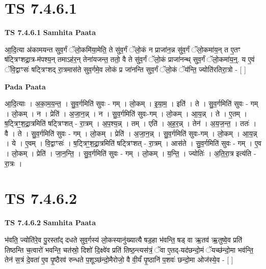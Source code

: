 \documentclass[17pt]{extarticle}
\begin{document}
\section*{ TS 7.4.6.1 }

\textbf{TS 7.4.6.1 } \newline
\textbf{Samhita Paata} \newline

आ॒दि॒त्या अ॑कामयन्त सुव॒र्गं ॅलो॒कमि॑या॒मेति॒ ते सु॑व॒र्गं ॅलो॒कं न प्राजा॑न॒न्न सु॑व॒र्गं ॅलो॒कमा॑य॒न् त ए॒तꣳ ष॑ट्त्रिꣳशद्रा॒त्र-म॑पश्य॒न् तमाऽह॑र॒न् तेना॑यजन्त॒ ततो॒ वै ते सु॑व॒र्गं ॅलो॒कं प्राजा॑नन्थ् सुव॒र्गं ॅलो॒कमा॑य॒न्॒. य ए॒वं ॅवि॒द्वाꣳसः॑ षट्त्रिꣳशद् रा॒त्रमास॑ते सुव॒र्गमे॒व लोकं प्र जा॑नन्ति सुव॒र्गं ॅलो॒कं ॅय॑न्ति॒ ज्योति॑रतिरा॒त्रो - [  ] \newline

\textbf{Pada Paata} \newline

आ॒दि॒त्याः । अ॒का॒म॒य॒न्त॒ । सु॒व॒र्गमिति॑ सुवः - गम् । लो॒कम् । इ॒या॒म॒ । इति॑ । ते । सु॒व॒र्गमिति॑ सुवः - गम् । लो॒कम् । न । प्रेति॑ । अ॒जा॒न॒न्न् । न । सु॒व॒र्गमिति॑ सुवः-गम् । लो॒कम् । आ॒य॒न्न् । ते । ए॒तम् । ष॒ट्त्रिꣳ॒॒श॒द्रा॒त्रमिति॑ षट्त्रिꣳशत् - रा॒त्रम् । अ॒प॒श्य॒न्न् । तम् । एति॑ । अ॒ह॒र॒न्न् । तेन॑ । अ॒य॒ज॒न्त॒ । ततः॑ । वै । ते । सु॒व॒र्गमिति॑ सुवः - गम् । लो॒कम् । प्रेति॑ । अ॒जा॒न॒न्न् । सु॒व॒र्गमिति॑ सुवः-गम् । लो॒कम् । आ॒य॒न्न् । ये । ए॒वम् । वि॒द्वाꣳसः॑ । ष॒ट्त्रिꣳ॒॒श॒द्रा॒त्रमिति॑ षट्त्रिꣳशत् - रा॒त्रम् । आस॑ते । सु॒व॒र्गमिति॑ सुवः - गम् । ए॒व । लो॒कम् । प्रेति॑ । जा॒न॒न्ति॒ । सु॒व॒र्गमिति॑ सुवः - गम् । लो॒कम् । य॒न्ति॒ । ज्योतिः॑ । अ॒ति॒रा॒त्र इत्य॑ति - रा॒त्रः ।  \newline




\section*{ TS 7.4.6.2 }

\textbf{TS 7.4.6.2 } \newline
\textbf{Samhita Paata} \newline

भ॑वति॒ ज्योति॑रे॒व पु॒रस्ता᳚द् दधते सुव॒र्गस्य॑ लो॒कस्यानु॑ख्यात्यै षड॒हा भ॑वन्ति॒ षड् वा ऋ॒तव॑ ऋ॒तुष्वे॒व प्रति॑ तिष्ठन्ति च॒त्वारो॑ भवन्ति॒ चत॑स्रो॒ दिशो॑ दि॒क्ष्वे॑व प्रति॑ तिष्ठ॒न्त्यस॑त्रं॒ ॅवा ए॒तद्-यद॑छन्दो॒मं ॅयच्छ॑न्दो॒मा भव॑न्ति॒ तेन॑ स॒त्रं दे॒वता॑ ए॒व पृ॒ष्ठैरव॑ रुन्धते प॒शूञ्छ॑न्दो॒मैरोजो॒ वै वी॒र्यं॑ पृ॒ष्ठानि॑ प॒शवः॑ छन्दो॒मा ओज॑स्ये॒व - [  ] \newline
\end{document}
